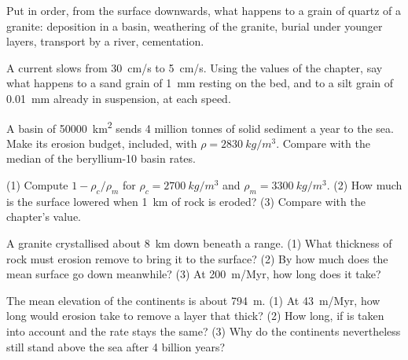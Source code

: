 \begin{exercise}[$\star$]\label{exo:g12:destruction-of-mountains:5}
Put in order, from the surface downwards, what happens to a grain of quartz
of a granite: deposition in a basin, weathering of the granite, burial under
younger layers, transport by a river, cementation.
\end{exercise}

\begin{exercise}[$\star\star$]\label{exo:g12:destruction-of-mountains:6}
A current slows from \qty{30}{cm/s} to \qty{5}{cm/s}. Using the values
of the chapter, say what happens to a sand grain of \qty{1}{mm} resting on
the bed, and to a silt grain of \qty{0.01}{mm} already in suspension, at
each speed.
\end{exercise}

\begin{exercise}[$\star\star$]\label{exo:g12:destruction-of-mountains:7}
A basin of \qty{50000}{km^2} sends 4 million tonnes of solid sediment a year
to the sea. Make its erosion budget,  included, with $\rho =
\qty{2830}{kg/m^3}$. Compare with the median of the beryllium-10 basin rates.
\end{exercise}

\begin{exercise}[$\star\star$]\label{exo:g12:destruction-of-mountains:8}
(1) Compute $1 - \rho_c/\rho_m$ for $\rho_c = \qty{2700}{kg/m^3}$ and
$\rho_m = \qty{3300}{kg/m^3}$. (2) How much is the surface lowered when
\qty{1}{km} of rock is eroded? (3) Compare with the chapter's value.
\end{exercise}

\begin{exercise}[$\star\star$]\label{exo:g12:destruction-of-mountains:9}
A granite crystallised about \qty{8}{km} down beneath a range. (1) What
thickness of rock must erosion remove to bring it to the surface? (2) By
how much does the mean surface go down meanwhile? (3) At \qty{200}{m/Myr},
how long does it take?
\end{exercise}

\begin{exercise}[$\star\star$]\label{exo:g12:destruction-of-mountains:10}
The mean elevation of the continents is about \qty{794}{m}. (1) At
\qty{43}{m/Myr}, how long would erosion take to remove a layer that thick?
(2) How long, if  is taken into account and the rate stays
the same? (3) Why do the continents nevertheless still stand above the sea
after 4 billion years?
\end{exercise}

